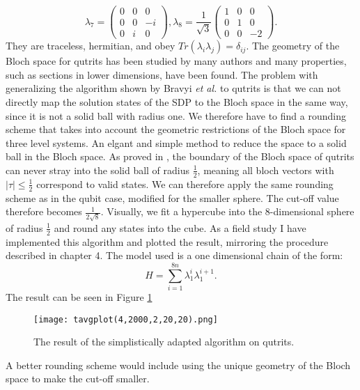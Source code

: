 \[
\lambda_7=\begin{pmatrix} 0 & 0 & 0 \\ 0 & 0 & -i \\ 0 & i & 0 \end{pmatrix},
\lambda_8=\frac{1}{\sqrt{3}} \begin{pmatrix} 1 & 0 & 0 \\ 0 & 1 & 0 \\ 0 & 0 & -2 \end{pmatrix}
.\]
They are traceless, hermitian, and obey $Tr\left(\lambda_i\lambda_j\right)=\delta_{ij}$.
The geometry of the Bloch space for qutrits has been studied by many authors \cite{mendas06,goyal16,kimura03} and many properties, such as sections in lower dimensions, have been found.
The problem with generalizing the algorithm shown by Bravyi \emph{et al.} to qutrits is that we can not directly map the solution states of the SDP to the Bloch space in the same way, since it is not a solid ball with radius one.
We therefore have to find a rounding scheme that takes into account the geometric restrictions of the Bloch space for three level systems.
An elgant and simple method to reduce the space to a solid ball in the Bloch space.
As proved in \cite{goyal16}, the boundary of the Bloch space of qutrits can never stray into the solid ball of radius $\frac{1}{2}$, meaning all bloch vectors with $ \left| \tau \right| \le \frac{1}{2}$ correspond to valid states. 
We can therefore apply the same rounding scheme as in the qubit case, modified for the smaller sphere.
The cut-off value therefore becomes $\frac{1}{2\sqrt{8}}$.
Visually, we fit a hypercube into the $8$-dimensional sphere of radius $\frac{1}{2}$ and round any states into the cube.
As a field study I have implemented this algorithm and plotted the result, mirroring the procedure described in chapter 4.
The model used is a one dimensional chain of the form: \[
H = \sum_{i=1}^{8n}\lambda_1^{i}\lambda_1^{i+1}
.\]
The result can be seen in Figure \ref{fig:4}
\begin{figure}[H]
	\centering
	\texttt{[image: tavgplot(4,2000,2,20,20).png]}
	\caption{The result of the simplistically adapted algorithm on qutrits.}
	\label{fig:4}
\end{figure}
\noindent A better rounding scheme would include using the unique geometry of the Bloch space to make the cut-off smaller.
